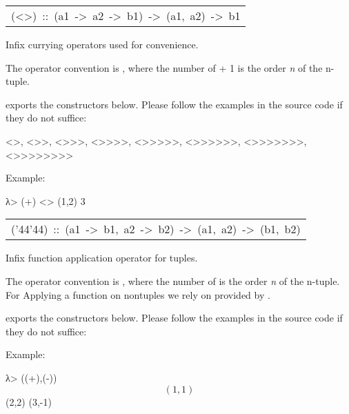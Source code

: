 \begin{haddockdesc}
\begin{interactive}
\end{interactive}

\item[\begin{tabular}{@{}l}
(<>)\ ::\ (a1\ ->\ a2\ ->\ b1)\ ->\ (a1,\ a2)\ ->\ b1
\end{tabular}]\haddockbegindoc
Infix currying operators used for convenience. \par
The operator convention is \haddocktt{(<>+)}, where the number of \haddocktt{>} + 1 is
 the order \emph{n} of the n-tuple.\par
{} exports the constructors below. Please
 follow the examples in the source code if they do not suffice:\par
\begin{code}
<>, <>>, <>>>, <>>>>, <>>>>>, <>>>>>>, <>>>>>>>, <>>>>>>>>\end{code}
Example:\par
\begin{interactive}
λ> (+) <> (1,2)
3

\end{interactive}

\item[\begin{tabular}{@{}l}
({\char '44}{\char '44})\ ::\ (a1\ ->\ b1,\ a2\ ->\ b2)\ ->\ (a1,\ a2)\ ->\ (b1,\ b2)
\end{tabular}]\haddockbegindoc
Infix function application operator for tuples. \par
The operator convention is , where the number of  is the
 order \emph{n} of the n-tuple. For Applying a function on nontuples we
 rely on  provided by .\par
{} exports the constructors below. Please
 follow the examples in the source code if they do not suffice:\par
\begin{code}
$$, $$$, $$$$, $$$$$, $$$$$$, $$$$$$$, $$$$$$$$, $$$$$$$$$\end{code}
Example:\par
\begin{interactive}
λ> ((+),(-)) $$ (1,1) $$ (2,2)
(3,-1)

\end{interactive}
\end{haddockdesc}